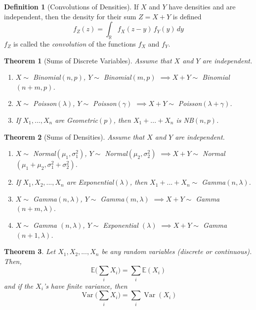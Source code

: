 \documentclass{article}
\DeclareMathOperator{\Var}{Var}
\newtheorem{theorem}{Theorem}[section]
\theoremstyle{remark}
\theoremstyle{definition}
\newtheorem{definition}{Definition}[section]
\begin{document}
\begin{definition}[Convolutions of Densities]
If $X$ and $Y$ have densities and are independent, then the density for their sum $Z = X + Y$ is defined
\[f_Z (z) = \int_\mathbb{R} f_X(z - y) \, f_Y (y) \, dy\]
$f_Z$ is called the \textit{convolution} of the functions $f_X$ and $f_Y$. 
\end{definition}

\begin{theorem}[Sums of Discrete Variables]
Assume that $X$ and $Y$ are independent. 
\begin{enumerate}
    \item $X \sim$ Binomial$(n, p)$, $Y \sim$ Binomial$(m, p)$ $\implies X + Y \sim$ Binomial$(n + m, p)$. 
    \item $X \sim$ Poisson$(\lambda)$, $Y \sim$ Poisson$(\gamma)$ $\implies X + Y \sim$ Poisson$(\lambda + \gamma)$. 
    \item If $X_1, ..., X_n$ are Geometric$(p)$, then $X_1 + ... + X_n$ is NB$(n, p)$. 
\end{enumerate}
\end{theorem}

\begin{theorem}[Sums of Densities]
Assume that $X$ and $Y$ are independent. 
\begin{enumerate}
    \item $X \sim$ Normal$(\mu_1, \sigma_1^2)$, $Y \sim$ Normal$(\mu_2, \sigma_2^2)$ $\implies X + Y \sim$ Normal $(\mu_1 + \mu_2, \sigma_1^2 + \sigma_2^2)$. 
    \item If $X_1, X_2, ..., X_n$ are Exponential$(\lambda)$, then $X_1 + ... + X_n \sim$ Gamma$(n, \lambda)$.
    \item $X \sim$ Gamma$(n, \lambda)$, $Y \sim$ Gamma$(m, \lambda)$ $\implies X + Y \sim$ Gamma$(n + m, \lambda)$. 
    \item $X \sim$ Gamma $(n, \lambda)$, $Y \sim$ Exponential $(\lambda)$ $\implies X + Y \sim$ Gamma$(n+1, \lambda)$. 
\end{enumerate}
\end{theorem}

\begin{theorem}
Let $X_1, X_2, ..., X_n$ be any random variables (discrete or continuous). Then, 
\[\mathbb{E}\Big(\sum_i X_i\Big) = \sum_i \mathbb{E}(X_i)\]
and if the $X_i$'s have finite variance, then 
\[\Var \Big( \sum_i X_i \Big) = \sum_i \Var(X_i)\]
\end{theorem}
\end{document}
